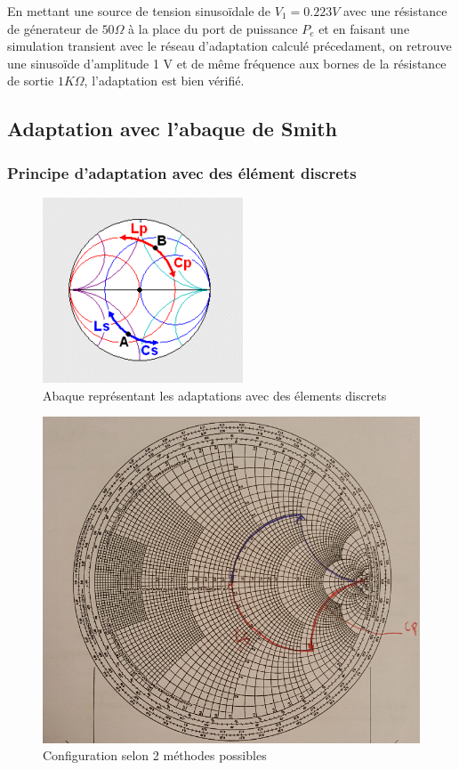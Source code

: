 \documentclass[a4paper]{article}
\begin{document}
En mettant une source de tension sinuso\"idale de $V_1 = 0.223 V$ avec une r\'esistance de g\'enerateur de $50 \Omega$ \`a la place du port de
puissance $P_e$ et en faisant une simulation transient avec le r\'eseau d'adaptation calcul\'e pr\'ecedament, on retrouve une sinuso\"ide d'amplitude
1 V et de m\^eme fr\'equence aux bornes de la r\'esistance de sortie $1 K\Omega$, l'adaptation est bien v\'erifi\'e.

\clearpage

\subsection{Adaptation avec l'abaque de Smith}
\subsubsection{Principe d'adaptation avec des \'el\'ement discrets}

\begin{figure}[!htb]
\begin{center}
  \includegraphics[scale=0.5]{adaptation_elements.png}
  \caption{Abaque repr\'esentant les adaptations avec des \'elements discrets\cite{conception-adaptation}}
\end{center}
\end{figure}

\begin{figure}[!htb]
\begin{center}
  \includegraphics[scale=0.5]{adaptation_elements_proposition.png}
  \caption{Configuration selon 2 m\'ethodes possibles}
\end{center}
\end{figure}
\end{document}
